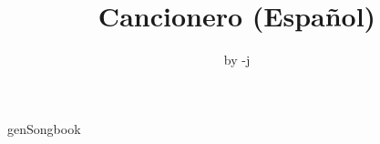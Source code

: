 \documentclass[11pt,a4paper,openany]{book}  %
\begin{document}
\Large

\title{Cancionero (Español)}
\author{by -j} 

\maketitle
\cleardoublepage
\tableofcontents
\newpage  %


genSongbook
\end{document}
